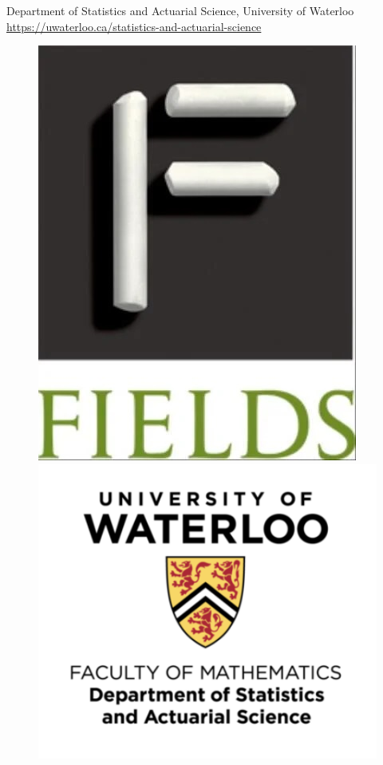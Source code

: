 Department of Statistics and Actuarial Science, University of Waterloo\\
\url{https://uwaterloo.ca/statistics-and-actuarial-science}\\

\begin{figure}[ht]
\includegraphics[scale =0.2]{Photos/fields_logo_extralarge}
\hfill
\includegraphics[scale =0.5]{Photos/UW.png}

\end{figure}

